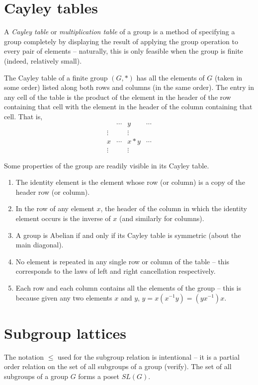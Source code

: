 \documentclass[svgnames]{article}
\theoremstyle{definition}
\theoremstyle{remark}
\begin{document}
\begin{appendices}
\section{Cayley tables}\label{sec:CayleyTables}
A \emph{Cayley table} or \emph{multiplication table} of a group is a method of specifying a group completely by displaying the result of applying the group operation to every pair of elements -- naturally, this is only feasible when the group is finite (indeed, relatively small).

The Cayley table of a finite group $(G, *)$ has all the elements of $G$ (taken in some order) listed along both rows and columns (in the same order). The entry in any cell of the table is the product of the element in the header of the row containing that cell with the element in the header of the column containing that cell. That is,
\begin{equation*}
\begin{array}{r|ccc}
		&	\cdots	&	y	&	\cdots\\
\hline
\vdots	&			&	\vdots	&		\\
x		&	\cdots	&	x*y		&	\cdots\\
\vdots	&			&	\vdots	&	
\end{array}
\end{equation*}

Some properties of the group are readily visible in its Cayley table.
\begin{enumerate}
\item The identity element is the element whose row (or column) is a copy of the header row (or column).
\item In the row of any element $x$, the header of the column in which the identity element occurs is the inverse of $x$ (and similarly for columns).
\item A group is Abelian if and only if its Cayley table is symmetric (about the main diagonal).
\item No element is repeated in any single row or column of the table -- this corresponds to the laws of left and right cancellation respectively.
\item Each row and each column contains all the elements of the group -- this is because given any two elements $x$ and $y$, $y = x(x^{-1}y) = (yx^{-1})x$.
\end{enumerate}

\section{Subgroup lattices}\label{def:SL(G)}
The notation $\le$ used for the subgroup relation is intentional -- it is a partial order relation on the set of all subgroups of a group {\small (verify)}. The set of all subgroups of a group $G$ forms a poset $SL(G)$.


\end{appendices}
\end{document}
